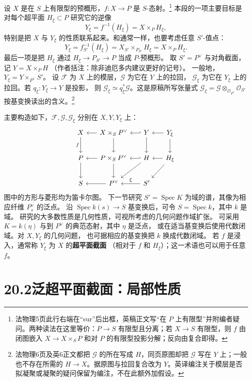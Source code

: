 \documentclass[openany,fontset=fandol]{ctexbook}
\newcommand{\OO}{\mathcal O}
\newcommand{\FF}{\mathcal F}
\newcommand{\GG}{\mathcal G}
\newcommand{\Spec}{\operatorname{Spec}}
\begin{document}
设 \(X\) 是在 \(S\) 上有限型的预概形，\(f:X\to P\) 是 \(S\)-态射。\footnote{法物理5页此行右端在“sur”后出框，英稿正文写“在 \(P\) 上有限型”并附编者疑问。两种读法在这里等价：\(P\to S\) 有限型且分离；若 \(X\to S\) 有限型，则 \(f\) 由闭图嵌入 \(X\to X\times_S P\) 和对 \(P\) 的有限型投影分解；反向由复合即得。}
本段的一项主要目标是对每个超平面 \(H_\xi\subset P\) 研究它的逆像
\[
 Y_\xi=f^{-1}(H_\xi)=X\times_P H_\xi,
\]
特别是把 \(X\) 与 \(Y_\xi\) 的性质联系起来。和通常一样，也要考虑任意 \(S'\)-值点：
\[
 Y_\xi=f_{S'}^{-1}(H_\xi)=X_{S'}\times_{P_{S'}}H_\xi
       =X\times_P H_\xi .
\]
最后一项是把 \(H_\xi\) 通过 \(H_\xi\to P_{S'}\to P\) 当成 \(P\)-预概形。
取 \(S'=P^\vee\) 与对角截面，记 \(Y=X\times_P H\)
（作者括注：除非迪厄多内建议更好的记号）。
一般地，\(Y_\xi=Y\times_{P^\vee}S'\)。
设 \(\FF\) 为 \(X\) 上的模层，\(\GG\) 为它在 \(Y\) 上的拉回，
\(\GG_\xi\) 为它在 \(Y_\xi\) 上的拉回。若 \(q_\xi:Y_\xi\to Y\) 是投影，
则 \(\GG_\xi\simeq q_\xi^*\GG\)。这是原稿所写张量式
\(\GG_\xi=\GG\otimes_{\OO_{P^\vee}}\OO_{S'}\) 按基变换读出的含义。\footnote{法物理6页及英6正文都把 \(\GG\) 的所在写成 \(H\)，同页原图却把 \(\GG\) 写在 \(Y\) 上；一般也不存在所需的 \(H\to X\)。据原图与拉回复合改为 \(Y\)。英译编注关于模层是否拟凝聚或凝聚的疑问保留为编注，不在此额外加假设。}

主要构造如下，\(\FF,\GG,\GG_\xi\) 分别在 \(X,Y,Y_\xi\) 上：
\[
\begin{tikzcd}[column sep=1.5em,row sep=2em]
X\arrow[d,"f"'] & X\times_S P^\vee\arrow[l]\arrow[d]
   &Y\arrow[l,hook']\arrow[d]&Y_\xi\arrow[l]\arrow[d]\\
P\arrow[d] & P\times_S P^\vee\arrow[l]\arrow[d]
   &H\arrow[l,hook']\arrow[dl]&H_\xi\arrow[l]\arrow[dl]\\
S & P^\vee\arrow[l]& S'\arrow[l,"\xi"']&
\end{tikzcd}
\]
图中的方形与菱形均为笛卡尔图。
下一节研究 \(S'=\Spec K\) 为域的谱，其像为相应纤维 \(P_s^\vee\) 的泛点。
沿 \(\Spec k(s)\to S\) 基变换后，可令 \(S=\Spec k\)，其中 \(k\) 是域。
研究的大多数性质是几何性质，可视所考虑的几何问题作域扩张。
可采用 \(K=k(\eta)\) 与到 \(P^\vee\) 的典范态射，其中 \(\eta\) 是泛点，
或在适当基变换后使用代数闭域。对 \(X,Y_\xi\) 的几何问题，
也可据相应的基变换把 \(k\) 换成代数闭域。
若 \(f\) 是浸入，通常称 \(Y_\xi\) 为 \(X\) 的\textbf{超平面截面}
（相对于 \(f\) 和 \(H_\xi\)）；这一术语也可以用于任意 \(f\)。

\section*{20.2\quad 泛超平面截面：局部性质}
\end{document}
